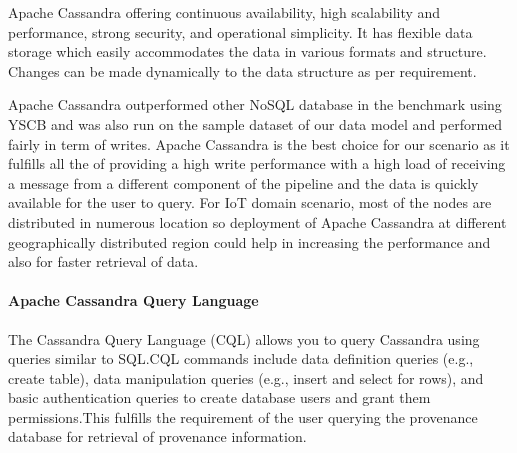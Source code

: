 Apache Cassandra offering continuous availability, high scalability and performance, strong security, and operational simplicity. It has flexible data storage which easily accommodates the data in various formats and structure. Changes can be made dynamically to the data structure as per requirement.

Apache Cassandra outperformed other NoSQL database in the benchmark using YSCB and was also run on the sample dataset of our data model and performed fairly in term of writes. 
Apache Cassandra is the best choice for our scenario as it fulfills all the of providing a high write performance with a high load of receiving a message from a different component of the pipeline and the data is quickly available for the user to query. For IoT domain scenario, most of the nodes are distributed in numerous location so deployment of Apache Cassandra at different geographically distributed region could help in increasing the performance and also for faster retrieval of data.

\paragraph*{Apache Cassandra Query Language}
The Cassandra Query Language (CQL) allows you to query Cassandra using queries similar to SQL.CQL commands include data definition queries (e.g., create table), data manipulation queries (e.g., insert and select for rows), and basic authentication queries to create database users and grant them permissions.This fulfills the requirement of the user querying the provenance database for retrieval of provenance information.